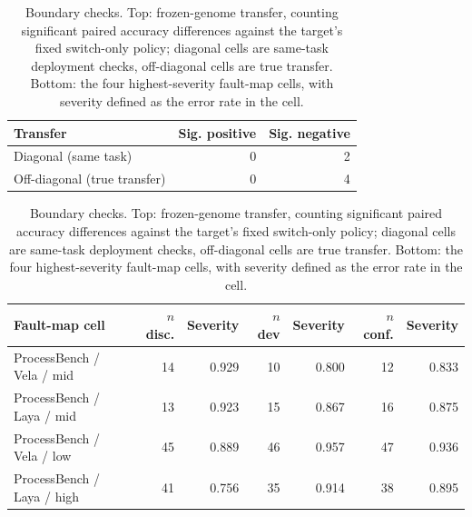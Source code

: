 \begin{table}[t]
\centering
\small
\caption{Boundary checks. Top: frozen-genome transfer, counting significant
paired accuracy differences against the target's fixed switch-only policy;
diagonal cells are same-task deployment checks, off-diagonal cells are true
transfer. Bottom: the four highest-severity fault-map cells, with severity
defined as the error rate in the cell.}
\label{tab:boundary}
\begin{tabular}{@{}lrr@{}}
\toprule
Transfer & Sig. positive & Sig. negative \\
\midrule
Diagonal (same task) & 0 & 2 \\
Off-diagonal (true transfer) & 0 & 4 \\
\bottomrule
\end{tabular}

\vspace{4pt}
\begin{tabular}{@{}lrrrrrr@{}}
\toprule
Fault-map cell & $n$ disc. & Severity & $n$ dev & Severity & $n$ conf. & Severity \\
\midrule
ProcessBench / Vela / mid & 14 & 0.929 & 10 & 0.800 & 12 & 0.833 \\
ProcessBench / Laya / mid & 13 & 0.923 & 15 & 0.867 & 16 & 0.875 \\
ProcessBench / Vela / low & 45 & 0.889 & 46 & 0.957 & 47 & 0.936 \\
ProcessBench / Laya / high & 41 & 0.756 & 35 & 0.914 & 38 & 0.895 \\
\bottomrule
\end{tabular}
\end{table}
